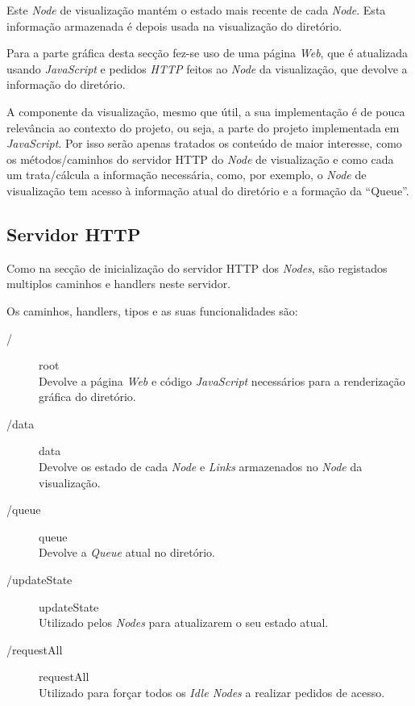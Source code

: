 Este \emph{Node} de visualização mantém o estado mais recente de cada \emph{Node}. 
Esta informação armazenada é depois usada na visualização do diretório.

Para a parte gráfica desta secção fez-se uso de uma página \emph{Web}, que é atualizada usando \emph{JavaScript} e 
pedidos \emph{HTTP} feitos ao \emph{Node} da visualização, que devolve a informação do diretório.

A componente da visualização, mesmo que útil, a sua implementação é de pouca relevância ao contexto do projeto, ou seja, a parte do projeto implementada em \emph{JavaScript}.
Por isso serão apenas tratados os conteúdo de maior interesse, como os métodos/caminhos do servidor \acs{HTTP} do \emph{Node} de visualização e como cada um trata/cálcula a informação necessária, como, por exemplo, o \emph{Node} de visualização tem acesso à informação atual do diretório e a formação da ``Queue''.



\subsection*{Servidor \acs{HTTP}}
Como na secção de inicialização do servidor \acs{HTTP} dos \emph{Nodes}, são registados 
multiplos caminhos e handlers neste servidor.

Os caminhos, handlers, tipos e as suas funcionalidades são:
\begin{description}
\item [/] root  \\ Devolve a página \emph{Web} e código \emph{JavaScript} necessários para a renderização gráfica do diretório.
\item [/data] data \\ Devolve os estado de cada \emph{Node} e \emph{Links} armazenados no \emph{Node} da visualização.
\item [/queue] queue \\ Devolve a \emph{Queue} atual no diretório.
\item [/updateState] updateState \\ Utilizado pelos \emph{Nodes} para atualizarem o seu estado atual.
\item [/requestAll] requestAll \\Utilizado para forçar todos os \emph{Idle Nodes} a realizar pedidos de acesso.
\end{description}


